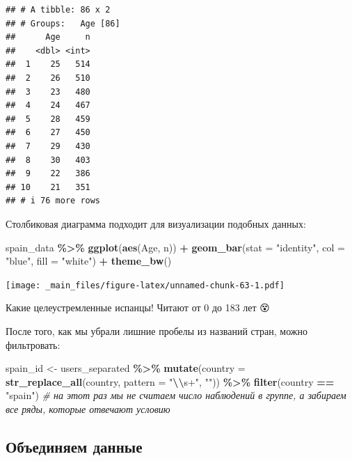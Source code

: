 \documentclass[
]{book}
\newenvironment{Shaded}{\begin{snugshade}}{\end{snugshade}}
\newcommand{\AttributeTok}[1]{\textcolor[rgb]{0.13,0.29,0.53}{#1}}
\newcommand{\CommentTok}[1]{\textcolor[rgb]{0.56,0.35,0.01}{\textit{#1}}}
\newcommand{\FunctionTok}[1]{\textcolor[rgb]{0.13,0.29,0.53}{\textbf{#1}}}
\newcommand{\NormalTok}[1]{#1}
\newcommand{\OtherTok}[1]{\textcolor[rgb]{0.56,0.35,0.01}{#1}}
\newcommand{\SpecialCharTok}[1]{\textcolor[rgb]{0.81,0.36,0.00}{\textbf{#1}}}
\newcommand{\StringTok}[1]{\textcolor[rgb]{0.31,0.60,0.02}{#1}}
\theoremstyle{definition}
\theoremstyle{definition}
\theoremstyle{definition}
\theoremstyle{definition}
\theoremstyle{remark}
\begin{document}
\begin{verbatim}
## # A tibble: 86 x 2
## # Groups:   Age [86]
##      Age     n
##    <dbl> <int>
##  1    25   514
##  2    26   510
##  3    23   480
##  4    24   467
##  5    28   459
##  6    27   450
##  7    29   430
##  8    30   403
##  9    22   386
## 10    21   351
## # i 76 more rows
\end{verbatim}

Столбиковая диаграмма подходит для визуализации подобных данных:

\begin{Shaded}
\begin{Highlighting}[]
\NormalTok{spain\_data }\SpecialCharTok{\%\textgreater{}\%} 
  \FunctionTok{ggplot}\NormalTok{(}\FunctionTok{aes}\NormalTok{(Age, n)) }\SpecialCharTok{+} 
  \FunctionTok{geom\_bar}\NormalTok{(}\AttributeTok{stat =} \StringTok{"identity"}\NormalTok{, }\AttributeTok{col =} \StringTok{"blue"}\NormalTok{, }\AttributeTok{fill =} \StringTok{"white"}\NormalTok{) }\SpecialCharTok{+}
  \FunctionTok{theme\_bw}\NormalTok{()}
\end{Highlighting}
\end{Shaded}

\texttt{[image: \_main\_files/figure-latex/unnamed-chunk-63-1.pdf]}

Какие целеустремленные испанцы! Читают от 0 до 183 лет 😵

После того, как мы убрали лишние пробелы из названий стран, можно фильтровать:

\begin{Shaded}
\begin{Highlighting}[]
\NormalTok{spain\_id }\OtherTok{\textless{}{-}}\NormalTok{ users\_separated }\SpecialCharTok{\%\textgreater{}\%}
  \FunctionTok{mutate}\NormalTok{(}\AttributeTok{country =} \FunctionTok{str\_replace\_all}\NormalTok{(country, }\AttributeTok{pattern =} \StringTok{"}\SpecialCharTok{\textbackslash{}\textbackslash{}}\StringTok{s+"}\NormalTok{, }\StringTok{""}\NormalTok{)) }\SpecialCharTok{\%\textgreater{}\%}
  \FunctionTok{filter}\NormalTok{(country }\SpecialCharTok{==} \StringTok{"spain"}\NormalTok{) }\CommentTok{\# на этот раз мы не считаем число наблюдений в группе, а забираем все ряды, которые отвечают условию}
\end{Highlighting}
\end{Shaded}

\hypertarget{ux43eux431ux44aux435ux434ux438ux43dux44fux435ux43c-ux434ux430ux43dux43dux44bux435}{%
\subsection{Объединяем данные}\label{ux43eux431ux44aux435ux434ux438ux43dux44fux435ux43c-ux434ux430ux43dux43dux44bux435}}
\end{document}
